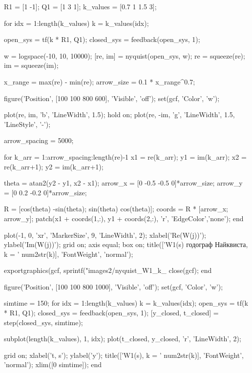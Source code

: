 \begin{matlabcode}
R1 = [1 -1];
Q1 = [1 3 1];
k_values = [0.7 1 1.5 3];

for idx = 1:length(k_values)
    k = k_values(idx);
    
    open_sys = tf(k * R1, Q1);
    closed_sys = feedback(open_sys, 1);
    
    w = logspace(-10, 10, 10000);
    [re, im] = nyquist(open_sys, w);
    re = squeeze(re);
    im = squeeze(im);
    
    x_range = max(re) - min(re);
    arrow_size = 0.1 * x_range^0.7;
    
    figure('Position', [100 100 800 600], 'Visible', 'off');
    set(gcf, 'Color', 'w');
    
    plot(re, im, 'b', 'LineWidth', 1.5);
    hold on;
    plot(re, -im, 'g', 'LineWidth', 1.5, 'LineStyle', '-');
    
    arrow_spacing = 5000;
    
    for k_arr = 1:arrow_spacing:length(re)-1
        x1 = re(k_arr);
        y1 = im(k_arr);
        x2 = re(k_arr+1);
        y2 = im(k_arr+1);
        
        theta = atan2(y2 - y1, x2 - x1);
        arrow_x = [0 -0.5 -0.5 0]*arrow_size;
        arrow_y = [0 0.2 -0.2 0]*arrow_size;
        
        R = [cos(theta) -sin(theta); sin(theta) cos(theta)];
        coords = R * [arrow_x; arrow_y];
        patch(x1 + coords(1,:), y1 + coords(2,:), 'r', 'EdgeColor','none');
    end
    
    plot(-1, 0, 'xr', 'MarkerSize', 9, 'LineWidth', 2);
    xlabel('Re(W(j\omega))');
    ylabel('Im(W(j\omega))');
    grid on;
    axis equal;
    box on;
    title(['W1(s) годограф Найквиста, k = ' num2str(k)], 'FontWeight', 'normal');
    
    exportgraphics(gcf, sprintf("images2/nyquist_W1_k_%
    close(gcf);
end

figure('Position', [100 100 800 1000], 'Visible', 'off');
set(gcf, 'Color', 'w');

simtime = 150;
for idx = 1:length(k_values)
    k = k_values(idx);
    open_sys = tf(k * R1, Q1);
    closed_sys = feedback(open_sys, 1);
    [y_closed, t_closed] = step(closed_sys, simtime);
    
    subplot(length(k_values), 1, idx);
    plot(t_closed, y_closed, 'r', 'LineWidth', 2);
    
    grid on;
    xlabel('t, s');
    ylabel('y');
    title(['W1(s), k = ' num2str(k)], 'FontWeight', 'normal');
    xlim([0 simtime]);
end


\end{matlabcode}

